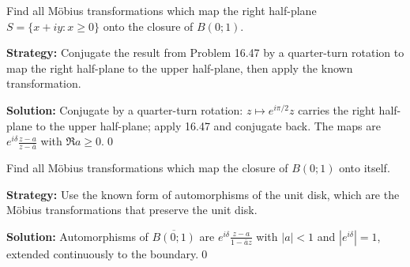 \begin{problembox}
\begin{problemstatement}
Find all Möbius transformations which map the right half-plane \( S = \{ x + i y : x \geq 0 \} \) onto the closure of \( B(0; 1) \).
\end{problemstatement}
\end{problembox}

\noindent\textbf{Strategy:} Conjugate the result from Problem 16.47 by a quarter-turn rotation to map the right half-plane to the upper half-plane, then apply the known transformation.

\bigskip\noindent\textbf{Solution:}
Conjugate by a quarter-turn rotation: $z\mapsto e^{i\pi/2}z$ carries the right half-plane to the upper half-plane; apply 16.47 and conjugate back. The maps are $e^{i\delta}\frac{z-a}{z-\bar a}$ with $\Re a\ge0$.\qed


\begin{problembox}
\begin{problemstatement}
Find all Möbius transformations which map the closure of \( B(0; 1) \) onto itself.
\end{problemstatement}
\end{problembox}

\noindent\textbf{Strategy:} Use the known form of automorphisms of the unit disk, which are the Möbius transformations that preserve the unit disk.

\bigskip\noindent\textbf{Solution:}
Automorphisms of $\overline{B(0;1)}$ are $e^{i\delta}\frac{z-a}{1-\bar a z}$ with $|a|<1$ and $|e^{i\delta}|=1$, extended continuously to the boundary.\qed


